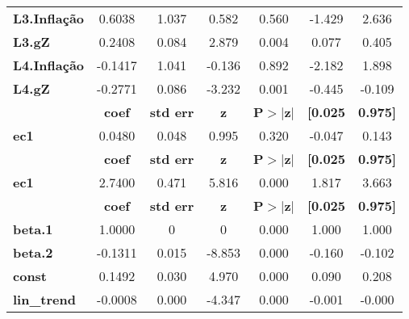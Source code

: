 \begin{center}
\begin{tabular}{lcccccc}
\textbf{L3.Inflação} &       0.6038  &        1.037     &     0.582  &         0.560        &       -1.429    &        2.636     \\
\textbf{L3.gZ}       &       0.2408  &        0.084     &     2.879  &         0.004        &        0.077    &        0.405     \\
\textbf{L4.Inflação} &      -0.1417  &        1.041     &    -0.136  &         0.892        &       -2.182    &        1.898     \\
\textbf{L4.gZ}       &      -0.2771  &        0.086     &    -3.232  &         0.001        &       -0.445    &       -0.109     \\
             & \textbf{coef} & \textbf{std err} & \textbf{z} & \textbf{P$> |$z$|$} & \textbf{[0.025} & \textbf{0.975]}  \\
\midrule
\textbf{ec1} &       0.0480  &        0.048     &     0.995  &         0.320        &       -0.047    &        0.143     \\
             & \textbf{coef} & \textbf{std err} & \textbf{z} & \textbf{P$> |$z$|$} & \textbf{[0.025} & \textbf{0.975]}  \\
\midrule
\textbf{ec1} &       2.7400  &        0.471     &     5.816  &         0.000        &        1.817    &        3.663     \\
                    & \textbf{coef} & \textbf{std err} & \textbf{z} & \textbf{P$> |$z$|$} & \textbf{[0.025} & \textbf{0.975]}  \\
\midrule
\textbf{beta.1}     &       1.0000  &            0     &         0  &         0.000        &        1.000    &        1.000     \\
\textbf{beta.2}     &      -0.1311  &        0.015     &    -8.853  &         0.000        &       -0.160    &       -0.102     \\
\textbf{const}      &       0.1492  &        0.030     &     4.970  &         0.000        &        0.090    &        0.208     \\
\textbf{lin\_trend} &      -0.0008  &        0.000     &    -4.347  &         0.000        &       -0.001    &       -0.000     \\
\bottomrule
\end{tabular}
\end{center}
